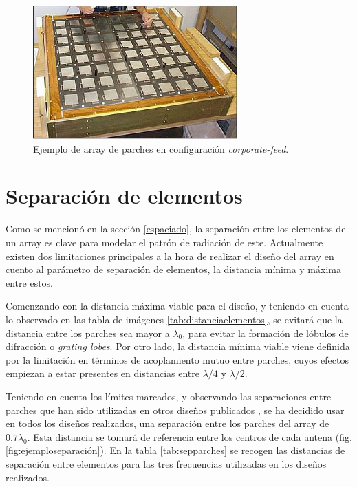 \begin{figure}[p]
    \centering
        \includegraphics[width=0.7\textwidth]{archivos/array/arrayraro}
        \caption{Ejemplo de array de parches en configuración \textit{corporate-feed}. \cite{NASA2008}}
        \label{fig:nasafoto}
\end{figure}

\section{Separación de elementos}
\label{sec:separacionelementos}
\par Como se mencionó en la sección \ref{espaciado}, la separación entre los elementos de un array es clave para modelar el patrón de radiación de este. Actualmente existen dos limitaciones principales a la hora de realizar el diseño del array en cuento al parámetro de separación de elementos, la distancia mínima y máxima entre estos.
\\
\par Comenzando con la distancia máxima viable para el diseño, y teniendo en cuenta lo observado en las tabla de imágenes \ref{tab:distanciaelementos}, se evitará que la distancia entre los parches sea mayor a $\lambda_{0}$, para evitar la formación de lóbulos de difracción o \textit{grating lobes}. Por otro lado, la distancia mínima viable viene definida por la limitación en términos de acoplamiento mutuo entre parches, cuyos efectos empiezan a estar presentes en distancias entre $\lambda/4$ y $\lambda/2$.
\\
\par Teniendo en cuenta los límites marcados, y observando las separaciones entre parches que han sido utilizadas en otros diseños publicados \cite{Waterhouse2010, Bertol2017}, se ha decidido usar en todos los diseños realizados, una separación entre los parches del array de $0.7\lambda_{0}$. Esta distancia se tomará de referencia entre los centros de cada antena (fig. \ref{fig:ejemploseparación}). En la tabla \ref{tab:sepparches} se recogen las distancias de separación entre elementos para las tres frecuencias utilizadas en los diseños realizados. 

